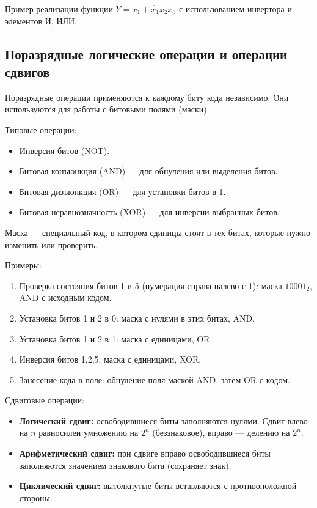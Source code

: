 \documentclass[a4paper,14pt]{report}
\begin{document}
Пример реализации функции $Y = \overline{x_1 + x_1 x_2 x_3}$ с использованием инвертора и элементов И, ИЛИ.

\subsection{Поразрядные логические операции и операции сдвигов}
Поразрядные операции применяются к каждому биту кода независимо. Они используются для работы с битовыми полями (маски).

Типовые операции:
\begin{itemize}
    \item Инверсия битов (NOT).
    \item Битовая конъюнкция (AND) — для обнуления или выделения битов.
    \item Битовая дизъюнкция (OR) — для установки битов в 1.
    \item Битовая неравнозначность (XOR) — для инверсии выбранных битов.
\end{itemize}

Маска — специальный код, в котором единицы стоят в тех битах, которые нужно изменить или проверить.

Примеры:
\begin{enumerate}
    \item Проверка состояния битов 1 и 5 (нумерация справа налево с 1): маска $10001_2$, AND с исходным кодом.
    \item Установка битов 1 и 2 в 0: маска с нулями в этих битах, AND.
    \item Установка битов 1 и 2 в 1: маска с единицами, OR.
    \item Инверсия битов 1,2,5: маска с единицами, XOR.
    \item Занесение кода в поле: обнуление поля маской AND, затем OR с кодом.
\end{enumerate}

Сдвиговые операции:
\begin{itemize}
    \item \textbf{Логический сдвиг:} освободившиеся биты заполняются нулями. Сдвиг влево на $n$ равносилен умножению на $2^n$ (беззнаковое), вправо — делению на $2^n$.
    \item \textbf{Арифметический сдвиг:} при сдвиге вправо освободившиеся биты заполняются значением знакового бита (сохраняет знак).
    \item \textbf{Циклический сдвиг:} вытолкнутые биты вставляются с противоположной стороны.
\end{itemize}
\end{document}
